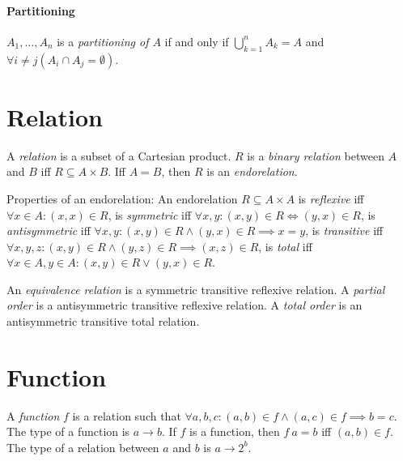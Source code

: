 \paragraph{Partitioning}
\(A_1,\ldots,A_n\) is a \emph{partitioning of \(A\)} if and only if
\(\bigcup_{k=1}^n A_k = A\) and
\(\forall i \neq j (A_i \cap A_j = \emptyset)\).

\section{Relation}

%
A \emph{relation} is a subset of a Cartesian product.
%
%
\(R\) is a \emph{binary relation} between \(A\) and \(B\) iff \(R \subseteq A \times B\).
Iff \(A = B\), then \(R\) is an \emph{endorelation}.

Properties of an endorelation:
%
%
An endorelation \(R \subseteq A \times A\) is \emph{reflexive} iff
\(\forall x \in A : (x,x) \in R\),
%
%
is \emph{symmetric} iff
\(\forall x,y: (x,y) \in R \iff (y,x) \in R\),
%
%
is \emph{antisymmetric} iff
\(\forall x,y: (x,y) \in R \wedge (y,x) \in R \implies x = y\),
%
%
is \emph{transitive} iff
\(\forall x,y,z: (x,y) \in R \wedge (y,z) \in R \implies (x,z) \in R\),
%
%
is \emph{total} iff
\(\forall x \in A , y \in A : (x,y) \in R \vee (y,x) \in R\).

%
%
An \emph{equivalence relation} is a symmetric transitive reflexive relation.
%
%
%
%
A \emph{partial order} is a antisymmetric transitive reflexive relation.
A \emph{total order} is an antisymmetric transitive total relation.

\section{Function}

%
A \emph{function} \(f\) is a relation such that
\(\forall a, b, c : (a,b) \in f \wedge (a,c) \in f \implies b = c\).
The type of a function is \(a \to b\).
If \(f\) is a function, then \(f~a = b\) iff \((a,b) \in f\).
The type of a relation between \(a\) and \(b\) is \(a \to 2^b\).

